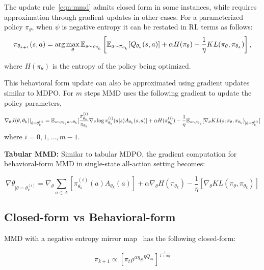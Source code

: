 The update rule~\ref{eqn:mmd} admits closed form in some instances, while requires approximation
through gradient updates in other cases.
For a parameterized policy $\pi_\theta$, when $\psi$ is negative entropy it can be restated in RL
terms as follows:
\begin{equation}
	\label{eqn:mmdbf} \pi_{ \theta_{k+1}}(s,a) = \arg \max_{\theta}
	\mathbb{E}_{s \sim \rho_{\theta_k}} \left[ \mathbb{E}_{a \sim \pi_{\theta_k}} [Q_{\theta_k}(s, a)] + \alpha
		H(\pi_\theta) - \frac{1}{\eta} KL(\pi_\theta, \pi_{\theta_k}) \right],
\end{equation}

where $H(\pi_\theta)$ is the entropy of the policy being optimized.

This behavioral form update can also be approximated using gradient updates similar to MDPO.
For $m$ steps MMD uses the following gradient to update the policy parameters,
\begin{equation}
	\label{eqn:mmdgrad} \nabla_{\theta} J(\theta, \theta_k)|_{\theta = \theta_k^{(i)}} = \mathbb{E}_{s \sim
		\rho_{\theta_k} \\ a \sim \theta_k} [ \frac{ \pi_{\theta_k}^{(i)}}{ \pi_{\theta_k}} \nabla_{\theta}
		\log \pi_{\theta_k}^{(i)} (a|s) A_{\theta_k}(s,a)] + \alpha H( \pi_{\theta_k}^{(i)}) -
	\frac{1}{\eta} \mathbb{E}_{s \sim \rho_{\theta_k}} [\nabla_\theta KL(s; \pi_\theta,
		\pi_{\theta_k})_{|\theta= \theta_k^{(i)}}]
\end{equation} where $i=0,1,\ldots,m-1$.

\textbf{Tabular MMD: }
Similar to tabular MDPO, the gradient computation for behavioral-form MMD in single-state
all-action setting becomes:

\begin{equation}
	\label{eqn:tabmmd} \nabla
	\theta_{|\theta=\theta_{k}^{(i)}} = \nabla_{\theta} \sum_{a \in A} [ \pi_{\theta_k}^{(i)} (a)
		A_{\theta_k}(a)] + \alpha \nabla_{\theta} H(\pi_{\theta_k}) - \frac{1}{\eta} [\nabla_\theta
		KL(\pi_\theta, \pi_{\theta_k})]
\end{equation}

\subsection{Closed-form vs
	Behavioral-form} MMD with a negative entropy mirror map~ \cite[equation (12)]{sokotaUnified2023}
has the following closed-form:

\begin{equation}
	\label{eqn:mmdcf} \pi_{k+1}
	\propto [\pi_t \rho^{\alpha \eta} e^{\eta Q_{\pi_k}}]^{ \frac{1}{1+\alpha \eta}}
\end{equation}

